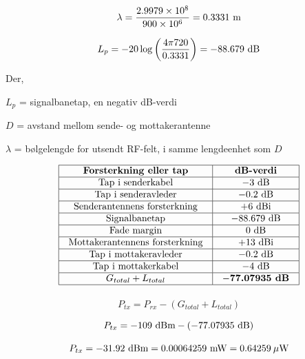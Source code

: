 





$$\lambda = {2.9979 \times 10^8 \over 900 \times 10^6} = 0.3331 \hbox{ m}$$

$$L_p = -20 \log \left(4 \pi 720 \over 0.3331\right) = -88.679 \hbox{ dB}$$

\noindent
Der,

$L_p$ = signalbanetap, en negativ dB-verdi

$D$ = avstand mellom sende- og mottakerantenne

$\lambda$ = bølgelengde for utsendt RF-felt, i samme lengdeenhet som $D$

\vskip 10pt


$$\vbox{\offinterlineskip
\halign{\strut
\vrule \quad\hfil # \ \hfil & 
\vrule \quad\hfil # \ \hfil \vrule \cr
\noalign{\hrule}
%
{\bf Forsterkning eller tap} & {\bf dB-verdi} \cr
%
\noalign{\hrule}
%
Tap i senderkabel & $-3$ dB \cr
%
\noalign{\hrule}
%
Tap i senderavleder & $-0.2$ dB \cr
%
\noalign{\hrule}
%
Senderantennens forsterkning & +6 dBi \cr
%
\noalign{\hrule}
%
Signalbanetap & $-88.679$ dB \cr
%
\noalign{\hrule}
%
Fade margin & 0 dB \cr
%
\noalign{\hrule}
%
Mottakerantennens forsterkning & +13 dBi \cr
%
\noalign{\hrule}
%
Tap i mottakeravleder & $-0.2$ dB \cr
%
\noalign{\hrule}
%
Tap i mottakerkabel & $-4$ dB \cr
%
\noalign{\hrule}
%
$G_{total} + L_{total}$ & {\bf $-$77.07935 dB} \cr
%
\noalign{\hrule}
} %
}$$ %


\vskip 10pt

$$P_{tx} = P_{rx} - (G_{total} + L_{total})$$

$$P_{tx} = -109 \hbox{ dBm} - ( -77.07935 \hbox{ dB})$$

$$P_{tx} = -31.92 \hbox{ dBm} = 0.00064259 \hbox{ mW} = 0.64259 \> \mu\hbox{W}$$


